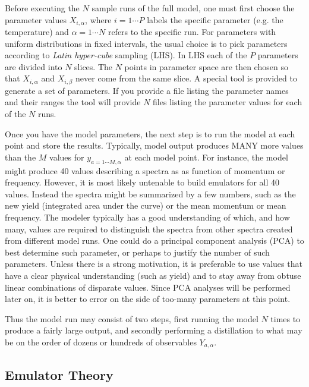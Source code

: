 Before executing the $N$ sample runs of the full model, one must first choose the parameter values $X_{i,\alpha}$, where $i=1\cdots P$ labels the specific parameter (e.g. the temperature) and $\alpha=1\cdots N$ refers to the specific run. For parameters with uniform distributions in fixed intervals, the usual choice is to pick parameters according to {\it Latin hyper-cube} sampling (LHS). In LHS each of the $P$ parameters are divided into $N$ slices. The $N$ points in parameter space are then chosen so that $X_{i,\alpha}$ and $X_{i,\beta}$ never come from the same slice.
A special tool is provided to generate a set of parameters. If you provide a file listing the parameter names and their ranges the tool will provide $N$ files listing the parameter values for each of the $N$ runs.

Once you have the model parameters, the next step is to run the model at each point and store the results. Typically, model output produces MANY more values than the $M$ values for $y_{a=1\cdots M,\alpha}$ at each model point. For instance, the model might produce 40 values describing a spectra as as function of momentum or frequency. However, it is most likely untenable to build emulators for all 40 values. Instead the spectra might be summarized by a few numbers, such as the new yield (integrated area under the curve) or the mean momentum or mean frequency. The modeler typically has a good understanding of which, and how many, values are required to distinguish the spectra from other spectra created from different model runs. One could do a principal component analysis (PCA) to best determine such parameter, or perhaps to justify the number of such parameters. Unless there is a strong motivation, it is preferable to use values that have a clear physical understanding (such as yield) and to stay away from obtuse linear combinations of disparate values. Since PCA analyses will be performed later on, it is better to error on the side of too-many parameters at this point.

Thus the model run may consist of two steps, first running the model $N$ times to produce a fairly large output, and secondly performing a distillation to what may be on the order of dozens or hundreds of observables $Y_{a,\alpha}$.

\subsection{Emulator Theory}

